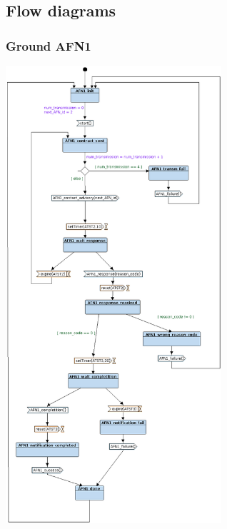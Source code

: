 \documentclass{article}
\begin{document}
\subsection{Flow diagrams}

\subsubsection{Ground AFN1}
\begin{center}
\includegraphics[width=0.6\textwidth]{./lab2_06.png}
\end{center}
\end{document}
